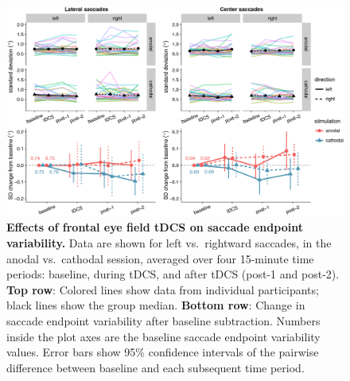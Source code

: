 \documentclass[11pt,english,]{memoir}
\begin{document}
\begin{figure}
\includegraphics[width=130mm]{sacc_tDCS_files/figures/figure_7_variability} \caption{\textbf{Effects of frontal eye field tDCS on saccade endpoint variability.} Data are shown for left vs.~rightward saccades, in the anodal vs.~cathodal session, averaged over four 15-minute time periods: baseline, during tDCS, and after tDCS (post-1 and post-2). \textbf{Top row}: Colored lines show data from individual participants; black lines show the group median. \textbf{Bottom row}: Change in saccade endpoint variability after baseline subtraction. Numbers inside the plot axes are the baseline saccade endpoint variability values. Error bars show 95\% confidence intervals of the pairwise difference between baseline and each subsequent time period.}\label{fig:fig-variability}
\end{figure}



\begingroup
\setlength{\LTleft}{-20cm plus -1fill}
\setlength{\LTright}{\LTleft}
\small
\end{document}
